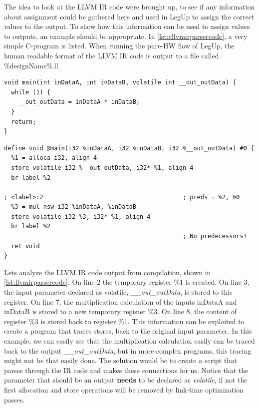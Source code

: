 The idea to look at the LLVM IR code were brought up, to see if any information about assignment could be gathered here and used in LegUp to assign the correct values to the output. To show how this information can be used to assign values to outputs, an example should be appropriate. In \cref{lst:cllvmirparsercode}, a very simple C-program is listed. When running the pure-HW flow of LegUp, the human readable format of the LLVM IR code is output to a file called \%designName\%.ll.
\lstset{language=C,style=Cstyle}
\begin{lstlisting}[caption={Simple C-code example for LLVM IR parsing},label=lst:cllvmirparsercode]
void main(int inDataA, int inDataB, volatile int __out_outData) {
  while (1) {
    __out_outData = inDataA * inDataB;
  }
  return;
}
\end{lstlisting}
\lstset{language=LLVM,style=LLVMStyle}
\begin{lstlisting}[caption={LLVM IR code for simple parsing example},label=lst:llvmirparsercode]
define void @main(i32 %inDataA, i32 %inDataB, i32 %__out_outData) #0 {
  %1 = alloca i32, align 4
  store volatile i32 %__out_outData, i32* %1, align 4
  br label %2

; <label>:2                                       ; preds = %2, %0
  %3 = mul nsw i32 %inDataA, %inDataB
  store volatile i32 %3, i32* %1, align 4
  br label %2
                                                  ; No predecessors!
  ret void
}
\end{lstlisting}
Lets analyze the LLVM IR code output from compilation, shown in \cref{lst:llvmirparsercode}. On line 2 the temporary register \%1 is created. On line 3, the input parameter declared as volatile, \textit{\_\_out\_outData}, is stored to this register. On line 7, the multiplication calculation of the inputs inDataA and inDataB is stored to a new temporary register \%3. On line 8, the content of register \%3 is stored back to register \%1. This information can be exploited to create a program that traces stores, back to the original input parameter. In this example, we can easily see that the multiplication calculation easily can be traced back to the output \textit{\_\_out\_outData}, but in more complex programs, this tracing might not be that easily done. The solution would be to create a script that parses through the IR code and makes these connections for us. Notice that the parameter that should be an output \textbf{needs} to be declared as \textit{volatile}, if not the first allocation and store operations will be removed by link-time optimization passes.

